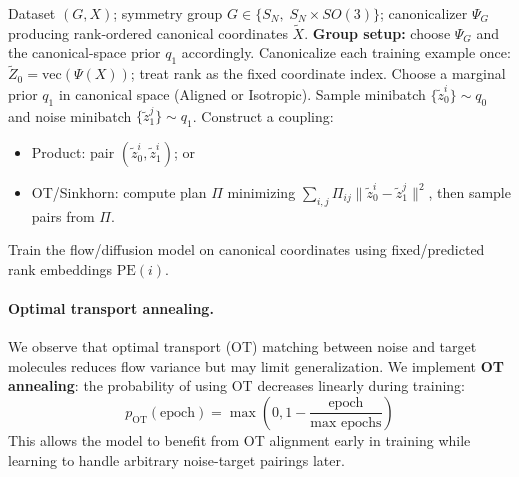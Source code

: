 \documentclass{article}
\theoremstyle{plain}
\theoremstyle{definition}
\theoremstyle{remark}
\newcommand{\1}{\mathbf{1}}
\begin{document}
\begin{algorithm}[ht]
\caption{Gap-free canonical training with optional OT coupling (no OT needed at inference)}
\label{alg:gapfree}
\begin{algorithmic}[1]
\REQUIRE Dataset $(G,X)$; symmetry group $G\in\{S_N,\;S_N\times SO(3)\}$; canonicalizer $\Psi_G$ producing rank-ordered canonical coordinates $\widetilde X$.
\STATE \textbf{Group setup:} choose $\Psi_G$ and the canonical-space prior $q_1$ accordingly.
\STATE Canonicalize each training example once: $\widetilde Z_0=\mathrm{vec}(\Psi(X))$; treat rank as the fixed coordinate index.
\STATE Choose a marginal prior $q_1$ in canonical space (Aligned or Isotropic).
  \STATE Sample minibatch $\{\widetilde z_0^i\}\sim q_0$ and noise minibatch $\{\widetilde z_1^j\}\sim q_1$.
  \STATE Construct a coupling:
    \begin{itemize}
    \item Product: pair $(\widetilde z_0^i,\widetilde z_1^i)$; or
    \item OT/Sinkhorn: compute plan $\Pi$ minimizing $\sum_{i,j}\Pi_{ij}\|\widetilde z_0^i-\widetilde z_1^j\|^2$, then sample pairs from $\Pi$.
    \end{itemize}
  \STATE Train the flow/diffusion model on canonical coordinates using fixed/predicted rank embeddings $\mathrm{PE}(i)$.
\ENDFOR
\end{algorithmic}
\end{algorithm}

\paragraph{Optimal transport annealing.} We observe that optimal transport (OT) matching between noise and target molecules reduces flow variance but may limit generalization. We implement \textbf{OT annealing}: the probability of using OT decreases linearly during training:
\begin{equation}
p_{\text{OT}}(\text{epoch}) = \max\left(0, 1 - \frac{\text{epoch}}{\text{max epochs}}\right)
\end{equation}
This allows the model to benefit from OT alignment early in training while learning to handle arbitrary noise-target pairings later.
\end{document}
